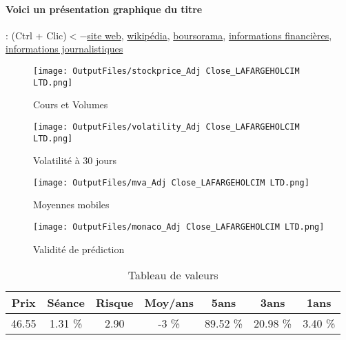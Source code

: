 \documentclass[11pt,a4paper]{report}%
\begin{document}
\paragraph{Voici un présentation graphique du titre} : (Ctrl + Clic)$<-$\href{https://www.lafargeholcim.com/investor-relations}{site web}, \href{https://fr.wikipedia.org/wiki/Lafarge_(entreprise)}{wikipédia}, \href{https://www.boursorama.com/cours/1rPLHN}{boursorama}, \href{https://www.qwant.com/?q=site:https:%2f%2fwww.easybourse.com%2faction-societe%2fLAFARGEHOLCIM-LTD&t=web&client=ext-firefox-hp}{informations financières}, \href{https://bourse.lerevenu.com/cours-de-bourse/fiche-valeur-synthese/LAFARGEHOLCIM-LTD/LHN-FR}{informations journalistiques}
\begin{figure}[!htb]
   \begin{minipage}{0.5\textwidth}
     \centering
     \texttt{[image: OutputFiles/stockprice\_Adj Close\_LAFARGEHOLCIM LTD.png]}
     \caption{Cours et Volumes}\label{Fig:price_LAFARGEHOLCIM LTD}
   \end{minipage}\hfill
   \begin{minipage}{0.5\textwidth}
     \centering
     \texttt{[image: OutputFiles/volatility\_Adj Close\_LAFARGEHOLCIM LTD.png]}
     \caption{Volatilité à 30 jours}\label{Fig:volat_LAFARGEHOLCIM LTD}
   \end{minipage}
\end{figure}
\begin{figure}[!htb]
   \begin{minipage}{0.5\textwidth}
     \centering
     \texttt{[image: OutputFiles/mva\_Adj Close\_LAFARGEHOLCIM LTD.png]}
     \caption{Moyennes mobiles}\label{Fig:mva_LAFARGEHOLCIM LTD}
   \end{minipage}\hfill
   \begin{minipage}{0.5\textwidth}
     \centering
     \texttt{[image: OutputFiles/monaco\_Adj Close\_LAFARGEHOLCIM LTD.png]}
     \caption{Validité de prédiction}\label{Fig:prediction_LAFARGEHOLCIM LTD}
   \end{minipage}
\end{figure}

\begin{table}[H]
  \centering
    \begin{tabular}{|c|c|c|c|c|c|c|}
    \hline
    Prix & Séance & Risque  & Moy/ans & 5ans & 3ans & 1ans \\
    \hline
    46.55 &    1.31 \%    & 2.90 & -3 \% & 89.52 \% & 20.98 \% & 3.40 \% \\
    \hline
    \end{tabular}%
        \label{tab:table_LAFARGEHOLCIM LTD}%
      \caption{Tableau de valeurs}
\end{table}%
\end{document}
